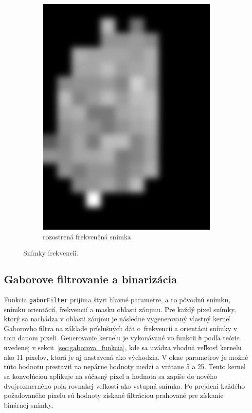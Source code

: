 \begin{figure}[h]
\begin{subfigure}[b]{0.3\linewidth}
      \includegraphics[width=\linewidth]{obrazky-figures/freqim_blur.png}
      \caption{rozostrená frekvenčná snímka}
    \end{subfigure}
    \caption{Snímky frekvencií.}
    \label{obr:frekvencie}
  \end{figure}

  \subsection{Gaborove filtrovanie a binarizácia} \label{sec:gabor_algo}
  Funkcia \texttt{gaborFilter} prijíma štyri hlavné parametre, a to pôvodnú snímku, snímku orientácií, frekvencií a masku oblasti záujmu. Pre každý pixel
  snímky, ktorý sa nachádza v oblasti záujmu je následne vygenerovaný vlastný kernel Gaborovho filtra na základe príslušných dát o~frekvencii a orientácii
  snímky v tom danom pixeli. Generovanie kernelu je vykonávané vo funkcii \texttt{h} podľa teórie uvedenej v sekcii~{\ref{sec:gaborova_funkcia}}, kde sa
  uvádza vhodná veľkosť kernelu ako 11 pixelov, ktorá je aj nastavená ako východzia. V okne parametrov je možné túto hodnotu prestaviť na nepárne hodnoty
  medzi a vrátane 5 a 25. Tento kernel sa konvolúciou aplikuje na súčasný pixel a hodnota sa zapíše do nového dvojrozmerného poľa rovnakej veľkosti ako
  vstupná snímka. Po prejdení každého požadovaného pixelu sú hodnoty získané filtráciou prahované pre získanie binárnej snímky.

